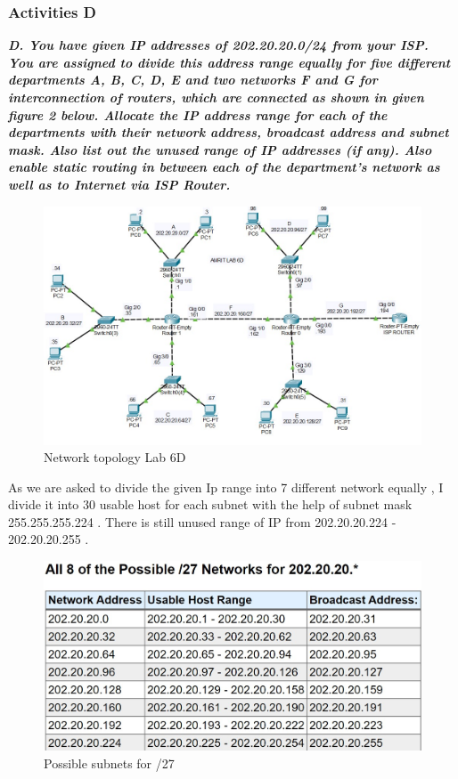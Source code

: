 \documentclass[a4paper,11pt]{article}
\begin{document}
\subsubsection{Activities D}

{\bfseries \textit{D. You have given IP addresses of 202.20.20.0/24 from your ISP. You are assigned to divide this
        address range equally for five different departments A, B, C, D, E and two networks F and G for
        interconnection of routers, which are connected as shown in given figure 2 below. Allocate the
        IP address range for each of the departments with their network address, broadcast address and
        subnet mask. Also list out the unused range of IP addresses (if any). Also enable static routing
        in between each of the department’s network as well as to Internet via ISP Router.}}


\begin{figure}[H]
    \centering
    \includegraphics[scale=0.8,cframe=blue 0.5pt 3pt]{./FIG/Lab6D.jpg}
    \caption{Network topology Lab 6D}
\end{figure}

As we are asked to divide the given Ip range into 7 different network equally , I divide it into 30 usable host for each subnet with the help of subnet mask 255.255.255.224 . There is still  unused range of IP from 202.20.20.224 - 202.20.20.255 .

\begin{figure}[H]
    \centering
    \includegraphics[scale=0.73,cframe=blue 0.5pt 3pt]{./FIG/D27.jpg}
    \caption{Possible subnets for /27 }
\end{figure}
\end{document}
